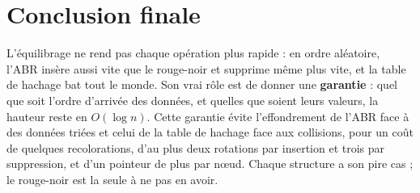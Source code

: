 \documentclass[12pt,a4paper]{report}
\begin{document}
\section{Conclusion finale}
L'équilibrage ne rend pas chaque opération plus rapide : en ordre aléatoire, l'ABR insère aussi vite que le rouge-noir et supprime même plus vite, et la table de hachage bat tout le monde. Son vrai rôle est de donner une \textbf{garantie} : quel que soit l'ordre d'arrivée des données, et quelles que soient leurs valeurs, la hauteur reste en $O(\log n)$. Cette garantie évite l'effondrement de l'ABR face à des données triées et celui de la table de hachage face aux collisions, pour un coût de quelques recolorations, d'au plus deux rotations par insertion et trois par suppression, et d'un pointeur de plus par nœud. Chaque structure a son pire cas ; le rouge-noir est la seule à ne pas en avoir.
\end{document}
